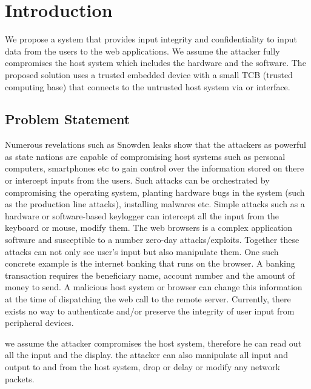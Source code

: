 \section{Introduction}
\label{sec:introduction}

We propose a system that provides input integrity and confidentiality to input data from the users to the web applications. We assume the attacker fully compromises the host system which includes the hardware and the software. The proposed solution uses a trusted embedded device with a small TCB (trusted computing base) that connects to the untrusted host system via \usb or \bluetooth interface.  

\subsection{Problem Statement}

Numerous revelations such as Snowden leaks show that the attackers as powerful as state nations are capable of compromising host systems such as personal computers, smartphones etc to gain control over the information stored on there or intercept inputs from the users. Such attacks can be orchestrated by compromising the operating system, planting hardware bugs in the system (such as the production line attacks), installing malwares etc. Simple attacks such as a hardware or software-based keylogger can intercept all the input from the keyboard or mouse, modify them. The web browsers is a complex application software and susceptible to a number zero-day attacks/exploits. Together these attacks can not only see user's input but also manipulate them. One such concrete example is the internet banking that runs on the browser. A banking transaction requires the beneficiary name, account number and the amount of money to send. A malicious host system or browser can change this information at the time of dispatching the web call to the remote server. Currently, there exists no way to authenticate and/or preserve the integrity of user input from peripheral devices. 

\iffalse
we extend this idea to detect and mitigate phishing attacks lunch by the attacker to steal user credential by imitating a legitimate looking website. there can be several ways the attacker can orchestrate the phishing attack; i) replicating a legitimate looking website and here the user failed to notice the security indicator such as the \ssl/\tls padlock indicating secure domain and the correct spelling of the website. ii) the host system is compromised and it renders legitimate looking website or directly steals sensitive information from user input.
\fi
we assume the attacker compromises the host system, therefore he can read out all the input and the display. the attacker can also manipulate all input and output to and from the host system, drop or delay or modify any network packets.


